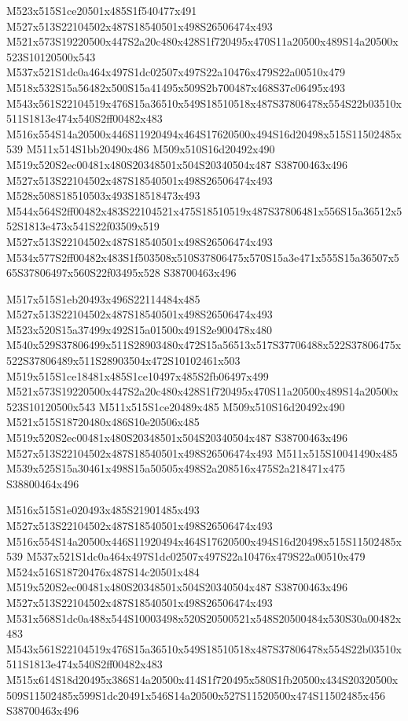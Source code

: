 \documentclass{article}
\begin{document}
\begin{multicols}{2}
M523x515S1ce20501x485S1f540477x491 M527x513S22104502x487S18540501x498S26506474x493 M521x573S19220500x447S2a20c480x428S1f720495x470S11a20500x489S14a20500x523S10120500x543 M537x521S1dc0a464x497S1dc02507x497S22a10476x479S22a00510x479 M518x532S15a56482x500S15a41495x509S2b700487x468S37c06495x493 M543x561S22104519x476S15a36510x549S18510518x487S37806478x554S22b03510x511S1813e474x540S2ff00482x483 M516x554S14a20500x446S11920494x464S17620500x494S16d20498x515S11502485x539 M511x514S1bb20490x486 M509x510S16d20492x490 M519x520S2ec00481x480S20348501x504S20340504x487 S38700463x496 M527x513S22104502x487S18540501x498S26506474x493 M528x508S18510503x493S18518473x493 M544x564S2ff00482x483S22104521x475S18510519x487S37806481x556S15a36512x552S1813e473x541S22f03509x519 M527x513S22104502x487S18540501x498S26506474x493 M534x577S2ff00482x483S1f503508x510S37806475x570S15a3e471x555S15a36507x565S37806497x560S22f03495x528 S38700463x496

M517x515S1eb20493x496S22114484x485 M527x513S22104502x487S18540501x498S26506474x493 M523x520S15a37499x492S15a01500x491S2e900478x480 M540x529S37806499x511S28903480x472S15a56513x517S37706488x522S37806475x522S37806489x511S28903504x472S10102461x503 M519x515S1ce18481x485S1ce10497x485S2fb06497x499 M521x573S19220500x447S2a20c480x428S1f720495x470S11a20500x489S14a20500x523S10120500x543 M511x515S1ce20489x485 M509x510S16d20492x490 M521x515S18720480x486S10e20506x485 M519x520S2ec00481x480S20348501x504S20340504x487 S38700463x496 M527x513S22104502x487S18540501x498S26506474x493 M511x515S10041490x485 M539x525S15a30461x498S15a50505x498S2a208516x475S2a218471x475 S38800464x496

M516x515S1e020493x485S21901485x493 M527x513S22104502x487S18540501x498S26506474x493 M516x554S14a20500x446S11920494x464S17620500x494S16d20498x515S11502485x539 M537x521S1dc0a464x497S1dc02507x497S22a10476x479S22a00510x479 M524x516S18720476x487S14c20501x484 M519x520S2ec00481x480S20348501x504S20340504x487 S38700463x496 M527x513S22104502x487S18540501x498S26506474x493 M531x568S1dc0a488x544S10003498x520S20500521x548S20500484x530S30a00482x483 M543x561S22104519x476S15a36510x549S18510518x487S37806478x554S22b03510x511S1813e474x540S2ff00482x483 M515x614S18d20495x386S14a20500x414S1f720495x580S1fb20500x434S20320500x509S11502485x599S1dc20491x546S14a20500x527S11520500x474S11502485x456 S38700463x496


\end{multicols}
\end{document}
